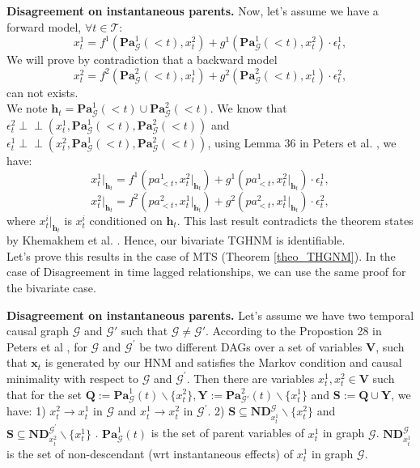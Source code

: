 \textbf{Disagreement on instantaneous parents. }Now, let's assume we have a forward model, $\forall t \in \mathcal{T}$:
\begin{equation*}
    x_t^1= f^1\left(\mathbf{P a}_{\mathcal{G}}^1(<t), x_t^2\right)+g^1\left(\mathbf{P a}_{\mathcal{G}}^1(<t), x_t^2\right)\cdot\epsilon_t^{1},
\end{equation*} 
We will prove by contradiction that a backward model $$x_t^2= f^2\left(\mathbf{P a}_{\mathcal{G}}^2(<t), x_t^1\right)+g^2\left(\mathbf{P a}_{\mathcal{G}}^2(<t), x_t^1\right)\cdot\epsilon_t^{2},$$ can not exists.\\
We note $\boldsymbol{h}_t = \mathbf{P a}_{\mathcal{G}}^1(<t) \cup \mathbf{P a}_{\mathcal{G}}^2(<t)$. We know that $\epsilon_t^{2} \perp\!\!\!\perp (x_t^1, \mathbf{P a}_{\mathcal{G}}^1(<t), \mathbf{P a}_{\mathcal{G}}^2(<t))$ and $\epsilon_t^{1} \perp\!\!\!\perp (x_t^2, \mathbf{P a}_{\mathcal{G}}^1(<t), \mathbf{P a}_{\mathcal{G}}^2(<t))$, using Lemma 36 in Peters et al. \citep{peters2014causal}, we have:
\begin{equation*}
    x_t^1|_{\boldsymbol{h}_t}= f^1\left(pa^1_{<t}, x_t^2|_{\boldsymbol{h}_t}\right)+g^1\left(pa^1_{<t}, x_t^2|_{\boldsymbol{h}_t}\right)\cdot\epsilon_t^{1},
\end{equation*} 
$$x_t^2|_{\boldsymbol{h}_t}= f^2\left(pa^2_{<t}, x_t^1|_{\boldsymbol{h}_t}\right)+g^2\left(pa^2_{<t}, x_t^1|_{\boldsymbol{h}_t}\right)\cdot\epsilon_t^{2},$$
where $x_t^i|_{\boldsymbol{h}_t}$ is $x_t^i$ conditioned on $\boldsymbol{h}_t$. This last result contradicts the theorem states by Khemakhem et al. \citep{khemakhem2021causal}. Hence, our bivariate TGHNM is identifiable.\\

Let's prove this results in the case of MTS (Theorem \ref{theo_THGNM}). In the case of Disagreement in time lagged relationships, we can use the same proof for the bivariate case.

\textbf{Disagreement on instantaneous parents. }Let's assume we have two temporal causal graph $\mathcal{G}$ and $ \mathcal{G}'$ such that $\mathcal{G} \neq \mathcal{G}'$. According to the Propostion 28 in Peters et al \citep{peters2014causal}, for $\mathcal{G}$ and $\mathcal{G}^{\prime}$ be two different DAGs over a set of variables $\boldsymbol{V}$, such that $\boldsymbol{x}_t$ is generated by our HNM and satisfies the Markov condition and causal minimality with respect to $\mathcal{G}$ and $\mathcal{G}^{\prime}$. Then there are variables $x_t^1, x_t^2 \in \boldsymbol{V}$ such that for the set $\boldsymbol{Q}:= \mathbf{P a}_{\mathcal{G}}^1(t) \backslash\{x_t^2\}, \boldsymbol{Y}:=\mathbf{P a}_{\mathcal{G}'}^2(t)  \backslash\{x_t^1\}$ and $\boldsymbol{S}:=\boldsymbol{Q} \cup \boldsymbol{Y}$, we have: 1) $ x_t^2\rightarrow x_t^1$ in $\mathcal{G}$ and $x_t^1 \rightarrow x_t^2$ in $\mathcal{G}^{\prime}$. 2) $\boldsymbol{S} \subseteq \mathbf{N D}_{x_t^1}^{\mathcal{G}} \backslash\{x_t^2\}$ and $\boldsymbol{S} \subseteq \mathbf{N D}_{x_t^2}^{\mathcal{G}^{\prime}} \backslash\{x_t^1\}$ . $\mathbf{P a}_{\mathcal{G}}^1(t)$ is the set of parent variables of $x_t^1$ in graph $\mathcal{G}$. $\mathbf{N D}{ }_{x_t^1}^{\mathcal{G}}$ is the set of non-descendant (wrt instantaneous
effects) of $x_t^1$ in graph $\mathcal{G}$.

